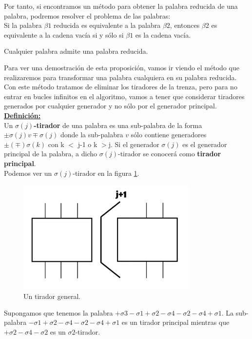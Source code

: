 \documentclass[14pt]{extarticle}
\begin{document}
Por tanto, si encontramos un método para obtener la palabra reducida de una palabra, podremos resolver el problema de las palabras: \\
Si la palabra $\beta1$ reducida es equivalente a la palabra $\beta2$, entonces $\beta2$ es equivalente a la cadena vacía si y sólo si $\beta1$ es la cadena vacía. \\

\begin{pro}
	Cualquier palabra admite una palabra reducida. 
\end{pro}

Para ver una demostración de esta proposición, vamos ir viendo el método que realizaremos para transformar una palabra cualquiera en su palabra reducida.\\ 
Con este método tratamos de eliminar los tiradores de la trenza, pero para no entrar en bucles infinitos en el algoritmo, vamos a tener que considerar tiradores generados por cualquier generador y no sólo por el generador principal.\\

\underline{\textbf{Definición:}}\\
 Un \textbf{$ \sigma(j) $-tirador} de una palabra es una sub-palabra de la forma $ \pm \sigma(j) v \mp \sigma(j) $ donde la sub-palabra $v$ sólo contiene generadores $ \pm (\mp) \sigma(k) $ con k $<$ j-1 o k $>$j. Si el generador $\sigma(j)$ es el generador principal de la palabra, a dicho $ \sigma(j) $-tirador se conocerá como \textbf{tirador principal}.\\
 
 Podemos ver un $ \sigma(j) $-tirador en la figura \ref{h2}.\\
 \begin{figure}[h!]
 	\centering
 	\includegraphics[width=9cm]{itrenzas/h12.png}
 	\caption{Un tirador general.}
 	\label{h2} 
 \end{figure}
 
 Supongamos que tenemos la palabra $ +\sigma3-\sigma1+\sigma2-\sigma4-\sigma2-\sigma4+\sigma1 $. La sub-palabra $ -\sigma1+\sigma2-\sigma4-\sigma2-\sigma4+\sigma1  $ es un tirador principal mientras que $ +\sigma2-\sigma4-\sigma2 $ es un $ \sigma2 $-tirador.\\
 
\end{document}
